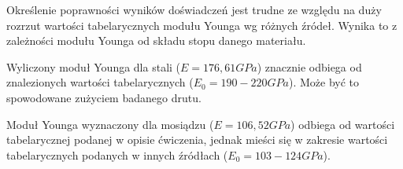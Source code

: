 \documentclass[a4paper,10pt,twoside]{article}
\begin{document}
Określenie poprawności wyników doświadczeń jest trudne ze względu na duży rozrzut wartości tabelarycznych modułu Younga wg różnych źródeł. Wynika to z zależności modułu Younga od składu stopu danego materiału.

Wyliczony moduł Younga dla stali ($E = 176,61 \unit{GPa}$) znacznie odbiega od znalezionych wartości tabelarycznych ($E_0 = 190 - 220 \unit{GPa}$). Może być to spowodowane zużyciem badanego drutu.

Moduł Younga wyznaczony dla mosiądzu ($ E = 106,52 \unit{GPa} $) odbiega od wartości tabelarycznej podanej w opisie ćwiczenia, jednak mieści się w zakresie wartości tabelarycznych podanych w innych źródłach ($ E_0 = 103 - 124 \unit{GPa} $).
\end{document}
